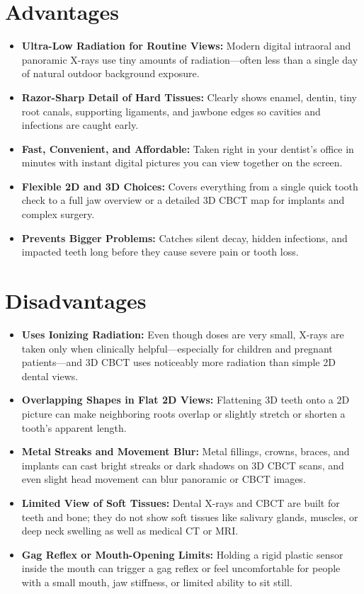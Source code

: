\section{Advantages}
\begin{itemize}
\item \textbf{Ultra-Low Radiation for Routine Views:} Modern digital intraoral and panoramic X-rays use tiny amounts of radiation---often less than a single day of natural outdoor background exposure.
\item \textbf{Razor-Sharp Detail of Hard Tissues:} Clearly shows enamel, dentin, tiny root canals, supporting ligaments, and jawbone edges so cavities and infections are caught early.
\item \textbf{Fast, Convenient, and Affordable:} Taken right in your dentist's office in minutes with instant digital pictures you can view together on the screen.
\item \textbf{Flexible 2D and 3D Choices:} Covers everything from a single quick tooth check to a full jaw overview or a detailed 3D CBCT map for implants and complex surgery.
\item \textbf{Prevents Bigger Problems:} Catches silent decay, hidden infections, and impacted teeth long before they cause severe pain or tooth loss.
\end{itemize}

\section{Disadvantages}
\begin{itemize}
\item \textbf{Uses Ionizing Radiation:} Even though doses are very small, X-rays are taken only when clinically helpful---especially for children and pregnant patients---and 3D CBCT uses noticeably more radiation than simple 2D dental views.
\item \textbf{Overlapping Shapes in Flat 2D Views:} Flattening 3D teeth onto a 2D picture can make neighboring roots overlap or slightly stretch or shorten a tooth's apparent length.
\item \textbf{Metal Streaks and Movement Blur:} Metal fillings, crowns, braces, and implants can cast bright streaks or dark shadows on 3D CBCT scans, and even slight head movement can blur panoramic or CBCT images.
\item \textbf{Limited View of Soft Tissues:} Dental X-rays and CBCT are built for teeth and bone; they do not show soft tissues like salivary glands, muscles, or deep neck swelling as well as medical CT or MRI.
\item \textbf{Gag Reflex or Mouth-Opening Limits:} Holding a rigid plastic sensor inside the mouth can trigger a gag reflex or feel uncomfortable for people with a small mouth, jaw stiffness, or limited ability to sit still.
\end{itemize}


